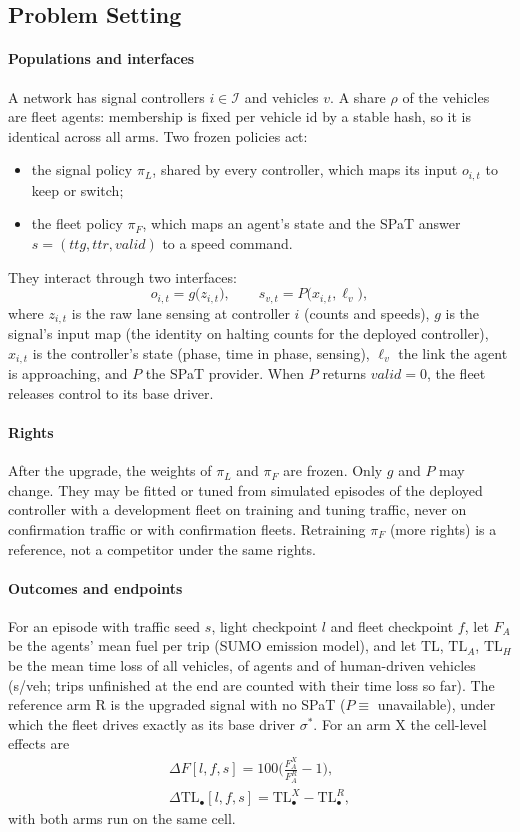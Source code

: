 \subsection{Problem Setting}\label{sec:setting}
\paragraph{Populations and interfaces} A network has signal controllers $i\in\mathcal I$ and vehicles $v$. A share $\rho$ of the vehicles
are fleet agents: membership is fixed per vehicle id by a stable hash, so it is identical across all arms. Two frozen policies act:
\begin{itemize}\setlength\itemsep{0pt}
\item the signal policy $\pi_L$, shared by every controller, which maps its input $o_{i,t}$ to keep or switch;
\item the fleet policy $\pi_F$, which maps an agent's state and the SPaT answer $s=(\mathit{ttg},\mathit{ttr},\mathit{valid})$ to a speed
command.
\end{itemize}
They interact through two interfaces:
\begin{equation}
o_{i,t} = g\big(z_{i,t}\big), \qquad s_{v,t} = P\big(x_{i,t}, \ell_v\big),
\end{equation}
where $z_{i,t}$ is the raw lane sensing at controller $i$ (counts and speeds), $g$ is the signal's input map (the identity on halting
counts for the deployed controller), $x_{i,t}$ is the controller's state (phase, time in phase, sensing), $\ell_v$ the link the agent is
approaching, and $P$ the SPaT provider. When $P$ returns $\mathit{valid}=0$, the fleet releases control to its base driver.
\paragraph{Rights} After the upgrade, the weights of $\pi_L$ and $\pi_F$ are frozen. Only $g$ and $P$ may change. They may be fitted or
tuned from simulated episodes of the deployed controller with a development fleet on training and tuning traffic, never on confirmation
traffic or with confirmation fleets. Retraining $\pi_F$ (more rights) is a reference, not a competitor under the same rights.
\paragraph{Outcomes and endpoints} For an episode with traffic seed $s$, light checkpoint $l$ and fleet checkpoint $f$, let $F_A$ be the
agents' mean fuel per trip (SUMO emission model), and let $\mathrm{TL}$, $\mathrm{TL}_A$, $\mathrm{TL}_H$ be the mean time loss of all vehicles,
of agents and of human-driven vehicles (s/veh; trips unfinished at the end are counted with their time loss so far). The reference arm R
is the upgraded signal with no SPaT ($P\equiv$ unavailable), under which the fleet drives exactly as its base driver $\sigma^*$. For an arm
X the cell-level effects are
\begin{gather}
\Delta F[l,f,s] = 100\Big(\frac{F_A^{X}}{F_A^{R}}-1\Big),\\
\Delta\mathrm{TL}_\bullet[l,f,s]=\mathrm{TL}_\bullet^{X}-\mathrm{TL}_\bullet^{R},
\end{gather}
with both arms run on the same cell.
